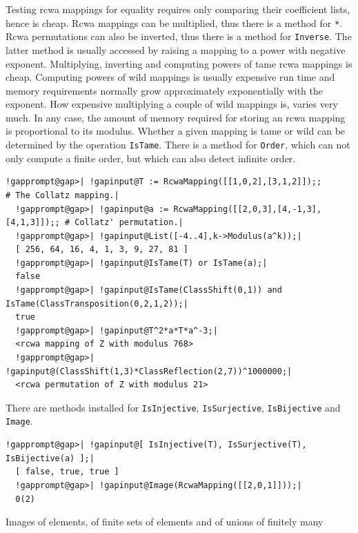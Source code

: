 \documentclass[a4paper,11pt]{report}
\begin{document}
{{ Testing rcwa mappings for equality requires only comparing their coefficient
lists, hence is cheap. Rcwa mappings can be multiplied, thus there is a method
for \texttt{*}. Rcwa permutations can also be inverted, thus there is a method for \texttt{Inverse}. The latter method is usually accessed by raising a mapping to a power with
negative exponent. Multiplying, inverting and computing powers of tame rcwa
mappings is cheap. Computing powers of wild mappings is usually expensive
\texttt{}\texttt{} run time and memory requirements
normally grow approximately exponentially with the exponent. How expensive
multiplying a couple of wild mappings is, varies very much. In any case, the
amount of memory required for storing an rcwa mapping is proportional to its
modulus. Whether a given mapping is tame or wild can be determined by the
operation \texttt{IsTame}. There is a method for \texttt{Order}, which can not only compute a finite order, but which can also detect
infinite order. 
\begin{Verbatim}[commandchars=!@|,fontsize=\small,frame=single,label=Example]
  !gapprompt@gap>| !gapinput@T := RcwaMapping([[1,0,2],[3,1,2]]);;          # The Collatz mapping.|
  !gapprompt@gap>| !gapinput@a := RcwaMapping([[2,0,3],[4,-1,3],[4,1,3]]);; # Collatz' permutation.|
  !gapprompt@gap>| !gapinput@List([-4..4],k->Modulus(a^k));|
  [ 256, 64, 16, 4, 1, 3, 9, 27, 81 ]
  !gapprompt@gap>| !gapinput@IsTame(T) or IsTame(a);|
  false
  !gapprompt@gap>| !gapinput@IsTame(ClassShift(0,1)) and IsTame(ClassTransposition(0,2,1,2));|
  true
  !gapprompt@gap>| !gapinput@T^2*a*T*a^-3;|
  <rcwa mapping of Z with modulus 768>
  !gapprompt@gap>| !gapinput@(ClassShift(1,3)*ClassReflection(2,7))^1000000;|
  <rcwa permutation of Z with modulus 21>
\end{Verbatim}
     There are methods installed for \texttt{IsInjective}, \texttt{IsSurjective}, \texttt{IsBijective} and \texttt{Image}. 
\begin{Verbatim}[commandchars=!@|,fontsize=\small,frame=single,label=Example]
  !gapprompt@gap>| !gapinput@[ IsInjective(T), IsSurjective(T), IsBijective(a) ];|
  [ false, true, true ]
  !gapprompt@gap>| !gapinput@Image(RcwaMapping([[2,0,1]]));|
  0(2)
\end{Verbatim}
  Images of elements, of finite sets of elements and of unions of finitely many
}}
\end{document}
